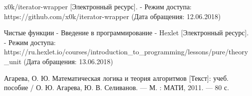 \begin{thebibliography}{00}
  x0k/iterator-wrapper
  [Электронный ресурс]. - Режим доступа: https://github.com/x0k/iterator-wrapper
  (Дата обращения: 12.06.2018)

  Чистые функции - Введение в программирование - Hexlet
  [Электронный ресурс]. - Режим доступа: https://ru.hexlet.io/courses/introduction\_to\_programming/lessons/pure/theory\_unit
  (Дата обращения: 13.06.2018)

  Агарева, О. Ю.
  Математическая логика и теория алгоритмов
  [Текст]: учеб. пособие /
  О. Ю. Агарева, Ю. В. Селиванов. --- М. : МАТИ, 2011. — 80 с.

\end{thebibliography}
\endgroup

\clearpage